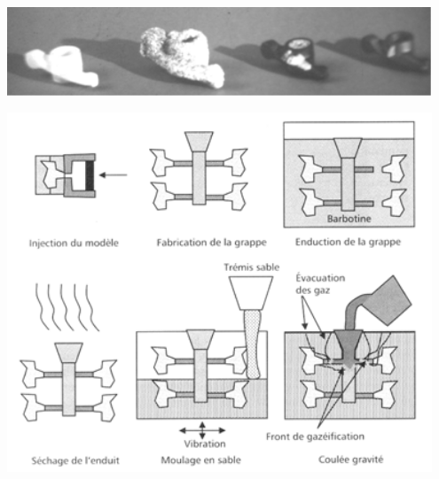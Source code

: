 \documentclass[11pt,oneside]{article}
\begin{document}
\begin{minipage}[c]{.45\linewidth}
\begin{center}
\includegraphics[width=0.95\textwidth]{png/cire1}
\end{center}
\end{minipage} \hfill
\begin{minipage}[c]{.45\linewidth}
\begin{center}
\includegraphics[width=0.95\textwidth]{png/cire2}
\end{center}
\end{minipage}
\end{document}
